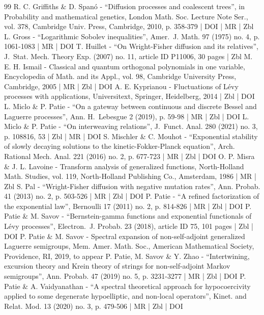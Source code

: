 \begin{thebibliography}{99}
R. C. Griffiths \& D. Spanó - “Diffusion processes and coalescent trees”, in Probability and mathematical genetics, London Math. Soc. Lecture Note Ser., vol. 378, Cambridge Univ. Press, Cambridge, 2010, p. 358-379 | DOI | MR | Zbl
L. Gross - “Logarithmic Sobolev inequalities”, Amer. J. Math. 97 (1975) no. 4, p. 1061-1083 | MR | DOI
T. Huillet - “On Wright-Fisher diffusion and its relatives”, J. Stat. Mech. Theory Exp. (2007) no. 11, article ID P11006, 30 pages | Zbl
M. E. H. Ismail - Classical and quantum orthogonal polynomials in one variable, Encyclopedia of Math. and its Appl., vol. 98, Cambridge University Press, Cambridge, 2005 | MR | Zbl | DOI
A. E. Kyprianou - Fluctuations of Lévy processes with applications, Universitext, Springer, Heidelberg, 2014 | Zbl | DOI
L. Miclo \& P. Patie - “On a gateway between continuous and discrete Bessel and Laguerre processes”, Ann. H. Lebesgue 2 (2019), p. 59-98 | MR | Zbl | DOI
L. Miclo \& P. Patie - “On interweaving relations”, J. Funct. Anal. 280 (2021) no. 3, p. 108816, 53 | Zbl | MR | DOI
S. Mischler \& C. Mouhot - “Exponential stability of slowly decaying solutions to the kinetic-Fokker-Planck equation”, Arch. Rational Mech. Anal. 221 (2016) no. 2, p. 677-723 | MR | Zbl | DOI
O. P. Misra \& J. L. Lavoine - Transform analysis of generalized functions, North-Holland Math. Studies, vol. 119, North-Holland Publishing Co., Amsterdam, 1986 | MR | Zbl
S. Pal - “Wright-Fisher diffusion with negative mutation rates”, Ann. Probab. 41 (2013) no. 2, p. 503-526 | MR | Zbl | DOI
P. Patie - “A refined factorization of the exponential law”, Bernoulli 17 (2011) no. 2, p. 814-826 | MR | Zbl | DOI
P. Patie \& M. Savov - “Bernstein-gamma functions and exponential functionals of Lévy processes”, Electron. J. Probab. 23 (2018), article ID 75, 101 pages | Zbl | DOI
P. Patie \& M. Savov - Spectral expansion of non-self-adjoint generalized Laguerre semigroups, Mem. Amer. Math. Soc., American Mathematical Society, Providence, RI, 2019, to appear
P. Patie, M. Savov \& Y. Zhao - “Intertwining, excursion theory and Krein theory of strings for non-self-adjoint Markov semigroups”, Ann. Probab. 47 (2019) no. 5, p. 3231-3277 | MR | Zbl | DOI
P. Patie \& A. Vaidyanathan - “A spectral theoretical approach for hypocoercivity applied to some degenerate hypoelliptic, and non-local operators”, Kinet. and Relat. Mod. 13 (2020) no. 3, p. 479-506 | MR | Zbl | DOI

\end{thebibliography}
